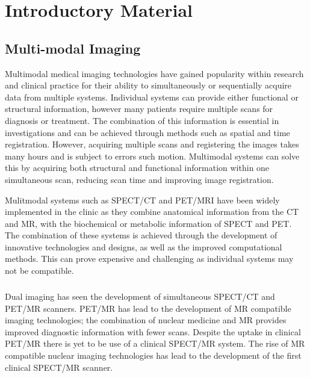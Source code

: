 \chapter{Introductory Material}
\label{chapterlabel1}

\section{Multi-modal Imaging} %
Multimodal medical imaging technologies have gained popularity within research and clinical practice for their ability to simultaneously or sequentially acquire data from multiple systems. Individual systems can provide either functional or structural information, however many patients require multiple scans for diagnosis or treatment. The combination of this information is essential in investigations and can be achieved through methods such as spatial and time registration. However, acquiring multiple scans and registering the images takes many hours and is subject to errors such motion. Multimodal systems can solve this by acquiring both structural and functional information within one simultaneous scan, reducing scan time and improving image registration. 

Mulitmodal systems such as SPECT/CT and PET/MRI have been widely implemented in the clinic as they combine anatomical information from the CT and MR, with the biochemical or metabolic information of SPECT and PET. The combination of these systems is achieved through the development of innovative technologies and designs, as well as the improved computational methods. This can prove expensive and challenging as individual systems may not be compatible. 

\paragraph{}
Dual imaging has seen the development of simultaneous \acrshort{SPECT/CT} and \acrshort{PET/MR} scanners. \acrshort{PET/MR} has lead to the development of \acrshort{MR} compatible imaging technologies; the combination of nuclear medicine and \acrshort{MR} provides improved diagnostic information with fewer scans. Despite the uptake in clinical  \acrshort{PET/MR} there is yet to be use of a clinical \acrshort{SPECT/MR} system. The rise of \acrshort{MR} compatible nuclear imaging technologies has lead to the development of the first clinical \acrshort{SPECT/MR} scanner.   
